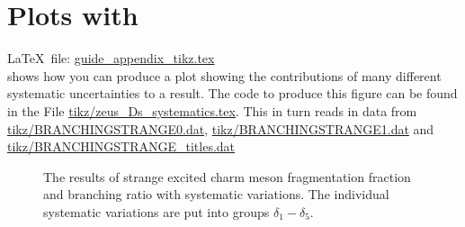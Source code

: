 
\chapter{Plots with \Package{\TikZ}}%
\label{sec:app:tikz}

\LaTeX\ file: \href{run:./guide_appendix_tikz.tex}{guide\_appendix\_tikz.tex}\\[1ex]
\noindent
{} shows how you can produce a plot showing
the contributions of many different systematic uncertainties to a
result.
The code to produce this figure can be found in the File
\href{../tikz/zeus_Ds_systematics.tex}{tikz/zeus\_Ds\_systematics.tex}.
This in turn reads in data from
\href{../tikz/BRANCHINGSTRANGE0.dat}{tikz/BRANCHINGSTRANGE0.dat},
\href{../tikz/BRANCHINGSTRANGE1.dat}{tikz/BRANCHINGSTRANGE1.dat} and
\href{../tikz/BRANCHINGSTRANGE_titles.dat}{tikz/BRANCHINGSTRANGE\_titles.dat}

\begin{figure}[htbp]
  \centering
  
  \caption[Strange $D^{**}$ systematics, fragmentation fractions]{The
    results of strange excited charm meson fragmentation fraction and
    branching ratio with systematic variations.  The individual
    systematic variations are put into groups $\delta_1-\delta_5$.}%
  \label{fig:tikz:syst}
\end{figure}

